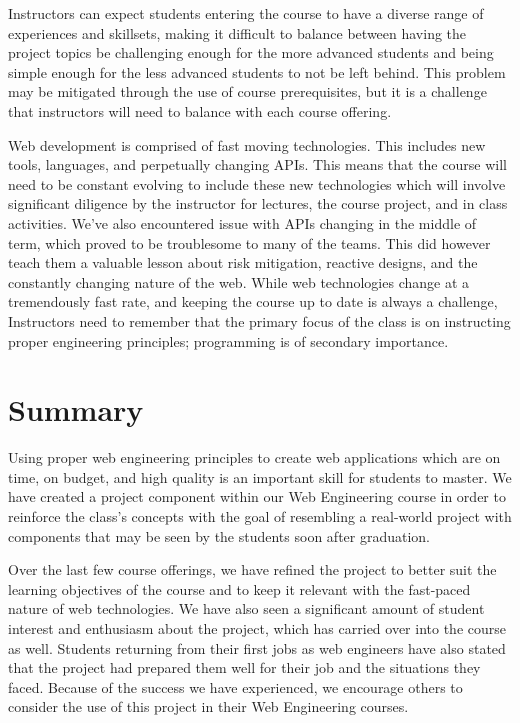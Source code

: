 \documentclass[conference]{IEEEtran}
\begin{document}
Instructors can expect students entering the course to have a diverse range of experiences and skillsets, making it difficult to balance between having the project topics be challenging enough for the more advanced students and being simple enough for the less advanced students to not be left behind. This problem may be mitigated through the use of course prerequisites, but it is a challenge that instructors will need to balance with each course offering.

Web development is comprised of fast moving technologies. This includes new tools, languages, and perpetually changing APIs. This means that the course will need to be constant evolving to include these new technologies which will involve significant diligence by the instructor for lectures, the course project, and in class activities. We've also encountered issue with APIs changing in the middle of term, which proved to be troublesome to many of the teams. This did however teach them a valuable lesson about risk mitigation, reactive designs, and the constantly changing nature of the web. While web technologies change at a tremendously fast rate, and keeping the course up to date is always a challenge, Instructors need to remember that the primary focus of the class is on instructing proper engineering principles; programming is of secondary importance. 






\section{Summary}
\label{sec: summary}

Using proper web engineering principles to create web applications which are on time, on budget, and high quality is an important skill for students to master. We have created a project component within our Web Engineering course in order to reinforce the class's concepts with the goal of resembling a real-world project with components that may be seen by the students soon after graduation.

Over the last few course offerings, we have refined the project to better suit the learning objectives of the course and to keep it relevant with the fast-paced nature of web technologies. We have also seen a significant amount of student interest and enthusiasm about the project, which has carried over into the course as well. Students returning from their first jobs as web engineers have also stated that the project had prepared them well for their job and the situations they faced. Because of the success we have experienced, we encourage others to consider the use of this project in their Web Engineering courses.



\balance


\end{document}
